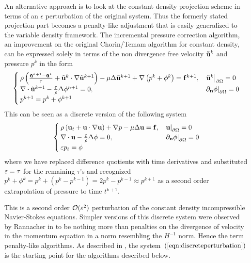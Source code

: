 \documentclass[letterpaper]{erdc}
\begin{document}
An alternative approach is to look at the constant density projection scheme in terms of an $\epsilon$ perturbation of the original system. Thus the formerly stated projection part becomes a penalty-like adjustment that is easily generalized to the variable density framework.  The incremental pressure correction algorithm, an improvement on the original Chorin/Temam algorithm for constant density, can be expressed solely in terms of the non divergence free velocity $\mathbf{\tilde{u}}^{k}$ and pressure $p^{k}$ in the form
\begin{equation}
  \begin{cases}
    \rho\left(\frac{\mathbf{\tilde{u}}^{k+1} - \mathbf{\tilde{u}}^{k}}{\tau} + \mathbf{\tilde{u}}^{k}\cdot\nabla\mathbf{\tilde{u}}^{k+1} \right) - \mu\Delta\mathbf{\tilde{u}}^{k+1} + \nabla\left(p^{k} + \phi^{k}  \right) = \mathbf{f}^{k+1}, & \left.\mathbf{\tilde{u}}^{k}\right|_{\partial\Omega} = 0\\
    \nabla\cdot\mathbf{\tilde{u}}^{k+1} - \frac{\tau}{\rho}\Delta\phi^{n+1}=0, &\left.\partial_{\textbf{n}} \phi\right|_{\partial\Omega} = 0\\
    p^{k+1} = p^{k} + \phi^{k+1}
  \end{cases}
\end{equation}
This can be seen as a discrete version of the following system   
\begin{equation}\label{eqn:discreteperturbation}
  \begin{cases}
    \rho\left(\textbf{u}_t + \textbf{u}\cdot\nabla\textbf{u}  \right) + \nabla p -\mu\Delta\textbf{u} = \mathbf{f}, & \left.\textbf{u}\right|_{\partial\Omega} = 0\\
    \nabla\cdot\textbf{u} - \frac{\varepsilon}{\rho}\Delta \phi = 0,& \left.\partial_{\textbf{n}} \phi\right|_{\partial\Omega} = 0\\
    \varepsilon p_t = \phi
  \end{cases}
\end{equation}
where we have replaced difference quotients with time derivatives and substituted $\varepsilon = \tau$ for the remaining $\tau$'s and recognized $p^{k} + \phi^{k} = p^{k} + \left( p^{k} - p^{k-1} \right) = 2p^{k} - p^{k-1} \approx p^{k+1}$ as a second order extrapolation of pressure to time $t^{k+1}$.

This is a second order $\mathcal{O}(\varepsilon^2)$ perturbation of the constant density incompressible Navier-Stokes equations.  Simpler versions of this discrete system were observed by Rannacher in \cite{rannacher1992chorin} to be nothing more than penalties on the divergence of velocity in the momentum equation in a norm resembling the $H^{-1}$ norm.  Hence the term penalty-like algorithms.  As described in \cite{guermond2009splitting}, the system~$\left(\ref{eqn:discreteperturbation}\right)$ is the starting point for the algorithms described below.
\end{document}
